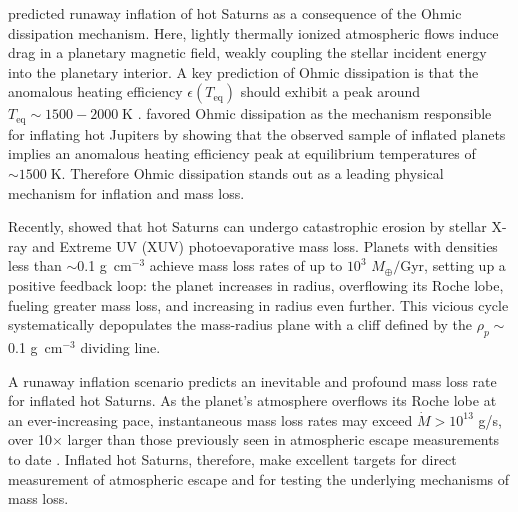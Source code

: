 \documentclass[linenumbers, twocolumn, trackchanges]{aastex631}
\begin{document}
\citet{2011ApJ...738....1B} predicted runaway inflation of hot Saturns as a consequence of the Ohmic dissipation mechanism.  Here, lightly thermally ionized atmospheric flows induce drag in a planetary magnetic field, weakly coupling the stellar incident energy into the planetary interior.  A key prediction of Ohmic dissipation is that the anomalous heating efficiency $\epsilon(T_\mathrm{eq})$ should exhibit a peak around $T_\mathrm{eq}\sim1500-2000\;$K \citep{2012ApJ...745..138M,2014ApJ...794..132R,2016ApJ...819..116G}. \citet{2018AJ....155..214T} favored Ohmic dissipation as the mechanism responsible for inflating hot Jupiters by showing that the observed sample of inflated planets implies an anomalous heating efficiency peak at equilibrium temperatures of $\sim1500\;$K.  Therefore Ohmic dissipation stands out as a leading physical mechanism for inflation and mass loss.

Recently, \citet{2023ApJ...945L..36T} showed that hot Saturns can undergo catastrophic erosion by stellar X-ray and Extreme UV (XUV) photoevaporative mass loss. Planets with densities less than $\sim$0.1 g~cm$^{-3}$ achieve mass loss rates of up to $10^3$ $M_\oplus /$Gyr, setting up a positive feedback loop: the planet increases in radius, overflowing its Roche lobe, fueling greater mass loss, and increasing in radius even further.  This vicious cycle systematically depopulates the mass-radius plane with a cliff defined by the $\rho_p \sim$0.1 g~cm$^{-3}$ dividing line.

A runaway inflation scenario predicts an inevitable and profound mass loss rate for inflated hot Saturns.  As the planet's atmosphere overflows its Roche lobe at an ever-increasing pace, instantaneous mass loss rates may exceed $\dot{M}>10^{13}$ g/s, over 10$\times$ larger than those previously seen in atmospheric escape measurements to date \citep{2022arXiv221116243D}.  Inflated hot Saturns, therefore, make excellent targets for direct measurement of atmospheric escape and for testing the underlying mechanisms of mass loss.
\end{document}
